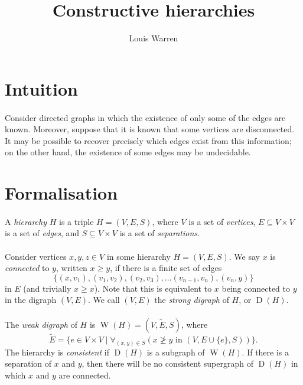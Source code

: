 \documentclass[a4paper]{article}
\title{Constructive hierarchies}
\author{Louis Warren}
\DeclareMathOperator{\WD}{W}
\DeclareMathOperator{\SD}{D}
\begin{document}
\maketitle

\section{Intuition}

\paragraph{}
Consider directed graphs in which the existence of only some of the edges are
known. Moreover, suppose that it is known that some vertices are disconnected.
It may be possible to recover precisely which edges exist from this information;
on the other hand, the existence of some edges may be undecidable.

\section{Formalisation}

\paragraph{}
A \emph{hierarchy} $H$ is a triple $H = (V, E, S)$, where $V$ is a set of
\emph{vertices}, $E \subseteq V \times V$ is a set of \emph{edges}, and $S
\subseteq V \times V$ is a set of \emph{separations}.

\paragraph{}
Consider vertices $x, y, z \in V$ in some hierarchy $H = (V, E, S)$. We say $x$
is \emph{connected} to $y$, written $x \geq y$, if there is a finite set of edges
\[
	\{(x, v_1), (v_1, v_2), (v_2, v_3), \dotsc (v_{n-1}, v_n), (v_n, y)\}
\]
in $E$ (and trivially $x \geq x$). Note that this is equivalent to $x$ being
connected to $y$ in the digraph $(V, E)$. We call $(V, E)$ the \emph{strong
digraph} of $H$, or $\SD(H)$.

\paragraph{}
The \emph{weak digraph} of $H$ is $\WD(H) = (V, \widetilde{E}, S)$, where
\[
	\widetilde{E} = \{ e \in V \times V \mid
		\forall_{(x, y) \in S}\left(
			x \not\geq y \text{ in } (V, E \cup\{e\}, S)
		\right)
	\}
. \]
The hierarchy is \emph{consistent} if $\SD(H)$ is a subgraph of $\WD(H)$.  If
there is a separation of $x$ and $y$, then there will be no consistent
supergraph of $\SD(H)$ in which $x$ and $y$ are connected.
\end{document}

